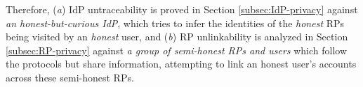 Therefore, (\emph{a}) IdP untraceability is proved in Section \ref{subsec:IdP-privacy} against \emph{an honest-but-curious IdP}, which tries to infer the identities of the \emph{honest} RPs being visited by an \emph{honest} user,
and (\emph{b}) RP unlinkability is analyzed in Section \ref{subsec:RP-privacy} against \emph{a group of semi-honest RPs and users} which follow the protocols but share information,
    attempting to link an honest user's accounts across these semi-honest RPs.

%






